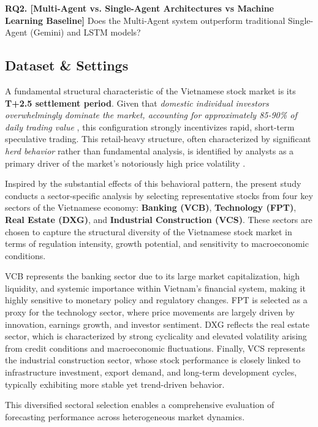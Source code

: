\documentclass{ieeeaccess}
\begin{document}
\textbf{RQ2. [Multi-Agent vs. Single-Agent Architectures vs Machine Learning Baseline]}  
Does the Multi-Agent system outperform traditional Single-Agent (Gemini) and LSTM models?


\subsection{Dataset \& Settings}
A fundamental structural characteristic of the Vietnamese stock market is its \textbf{T+2.5 settlement period}. Given that \textit{domestic individual investors overwhelmingly dominate the market, accounting for approximately 85-90\% of daily trading value} \cite{TinNhanhChungkhoan2025}, this configuration strongly incentivizes rapid, short-term speculative trading. This retail-heavy structure, often characterized by significant \textit{herd behavior} rather than fundamental analysis, is identified by analysts as a primary driver of the market's notoriously high price volatility \cite{WorldBank2024, Yuanta2025}.



Inspired by the substantial effects of this behavioral pattern, the present study conducts a sector-specific analysis by selecting representative stocks from four key sectors of the Vietnamese economy: \textbf{Banking (VCB)}, \textbf{Technology (FPT)}, \textbf{Real Estate (DXG)}, and \textbf{Industrial Construction (VCS)}. These sectors are chosen to capture the structural diversity of the Vietnamese stock market in terms of regulation intensity, growth potential, and sensitivity to macroeconomic conditions.

VCB represents the banking sector due to its large market capitalization, high liquidity, and systemic importance within Vietnam’s financial system, making it highly sensitive to monetary policy and regulatory changes. FPT is selected as a proxy for the technology sector, where price movements are largely driven by innovation, earnings growth, and investor sentiment. DXG reflects the real estate sector, which is characterized by strong cyclicality and elevated volatility arising from credit conditions and macroeconomic fluctuations. Finally, VCS represents the industrial construction sector, whose stock performance is closely linked to infrastructure investment, export demand, and long-term development cycles, typically exhibiting more stable yet trend-driven behavior.

This diversified sectoral selection enables a comprehensive evaluation of forecasting performance across heterogeneous market dynamics.
\end{document}
